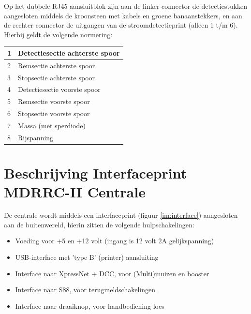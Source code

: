 \documentclass[12pt,a4paper]{report}
\begin{document}
Op het dubbele RJ45-aansluitblok zijn aan de linker connector de detectiestukken aangesloten middels de kroonsteen met kabels en groene banaanstekkers, en aan de rechter connector de uitgangen van de stroomdetectieprint (alleen 1 t/m 6). Hierbij geldt de volgende normering:\\

\begin{tabular}{|l|p{10cm}|}
\hline
1&Detectiesectie achterste spoor\\
\hline
2&Remsectie achterste spoor\\
\hline
3&Stopsectie achterste spoor\\
\hline
4&Detectiesectie voorste spoor\\
\hline
5&Remsectie voorste spoor\\
\hline
6&Stopsectie voorste spoor\\
\hline
7&Massa (met sperdiode)\\
\hline
8&Rijspanning\\
\hline
\end{tabular}

\chapter{Beschrijving Interfaceprint MDRRC-II Centrale}
\label{ch:interface_centrale}

De centrale wordt middels een interfaceprint (figuur \ref{im:interface}) aangesloten aan de buitenwereld, hierin zitten de volgende hulpschakelingen:

\begin{itemize}
\item Voeding voor +5 en +12 volt (ingang is 12 volt 2A gelijkspanning)
\item USB-interface met 'type B' (printer) aansluiting
\item Interface naar XpressNet + DCC, voor (Multi)muizen en booster
\item Interface naar S88, voor terugmeldschakelingen
\item Interface naar draaiknop, voor handbediening locs
\end{itemize}
\end{document}
